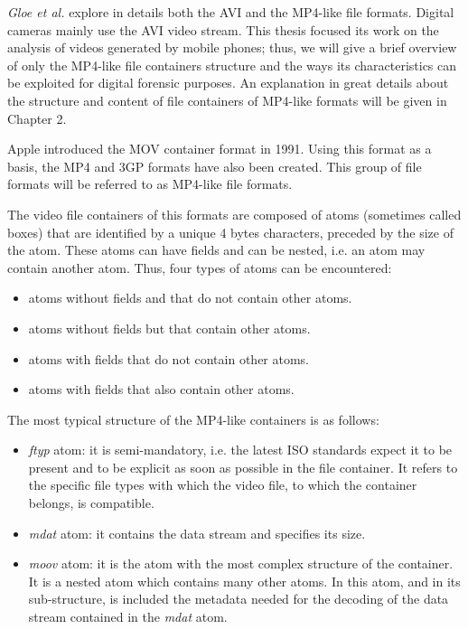 \emph{Gloe et al.} \cite{Gloe2014S68} explore in details both the AVI \cite{avi} and the MP4-like file formats. Digital cameras mainly use the AVI video stream. This thesis focused its work on the analysis of videos generated by mobile phones; thus, we will give a brief overview of only the MP4-like file containers structure and the ways its characteristics can be exploited for digital forensic purposes. An explanation in great details about the structure and content of file containers of MP4-like formats will be given in Chapter 2.

Apple introduced the MOV \cite{mov} container format in 1991. Using this format as a basis, the MP4 \cite{mp4} and 3GP formats have also been created. This group of file formats will be referred to as MP4-like file formats.

The video file containers of this formats are composed of atoms (sometimes called boxes) that are identified by a unique 4 bytes characters, preceded by the size of the atom. These atoms can have fields and can be nested, i.e. an atom may contain another atom. Thus, four types of atoms can be encountered:
\begin{itemize}
\item atoms without fields and that do not contain other atoms.
\item atoms without fields but that contain other atoms.
\item atoms with fields that do not contain other atoms.
\item atoms with fields that also contain other atoms.
\end{itemize}

The most typical structure of the MP4-like containers is as follows:
\begin{itemize}
\item \emph{ftyp} atom: it is semi-mandatory, i.e. the latest ISO standards expect it to be present and to be explicit as soon as possible in the file container. It refers to the specific file types with which the video file, to which the container belongs, is compatible.
\item \emph{mdat} atom: it contains the data stream and specifies its size.
\item \emph{moov} atom: it is the atom with the most complex structure of the container. It is a nested atom which contains many other atoms. In this atom, and in its sub-structure, is included the metadata needed for the decoding of the data stream contained in the \emph{mdat} atom.
\end{itemize}

